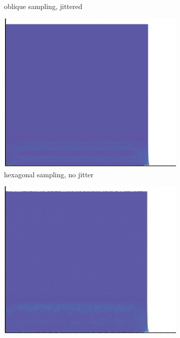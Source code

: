 \begin{figure}[H]
\begin{subfigure}[t]{0.49\textwidth}
    \caption{oblique sampling, jittered}
  \end{subfigure}
  \begin{subfigure}[t]{0.49\textwidth}
    \centering
    \includegraphics*[width=\textwidth]{images/initial/creghex_0_02s.jpg}
    \caption{hexagonal sampling, no jitter}
  \end{subfigure}
  \begin{subfigure}[t]{0.49\textwidth}
    \centering
    \includegraphics*[width=\textwidth]{images/initial/creghex_0_02_jit.jpg}

\end{subfigure}
\end{figure}
